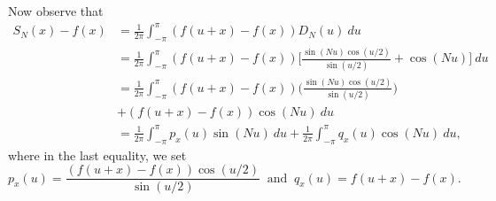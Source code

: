 Now observe that
\begin{align*}
    S_{N}(x) - f(x) &= \frac{ 1 }{ 2 \pi  } \int_{ - \pi  }^{ \pi  } (f(u+x) - f(x) ) D_{N}(u)     \ du \\ 
                    &= \frac{ 1 }{  2 \pi  } \int_{ -\pi  }^{ \pi  } (f(u+x) - f(x) ) \Big[ \frac{ \sin(Nu) \cos(u/2) }{ \sin(u/2) } + \cos(Nu) \Big] \ du \\
                    &= \frac{ 1 }{ 2\pi  } \int_{ -\pi  }^{ \pi  } (f(u+x) - f(x) ) \Big( \frac{ \sin(Nu) \cos(u/2) }{ \sin(u/2) }  \Big)  \\ 
                    &+ (f(u+x) - f(x)) \cos(Nu)  \ du \\
                    &= \frac{ 1 }{ 2 \pi  } \int_{ - \pi  }^{ \pi  } p_{x}(u) \sin(Nu)  \ du + \frac{ 1 }{ 2 \pi  } \int_{ -\pi  }^{ \pi  } q_{x}(u) \cos(Nu)  \ du,
\end{align*}
where in the last equality, we set 
\[ p_{x}(u) = \frac{ (f(u+x) - f(x)) \cos(u/2) }{ \sin(u/2) } \ \text{ and } \ q_{x}(u) = f(u+x) - f(x).    \]
 
